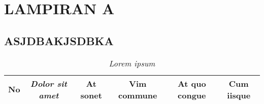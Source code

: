 \renewcommand{\thesection}{}
\renewcommand{\thesubsection}{\arabic{section}.\arabic{subsection}}
\makeatletter
\def\@seccntformat#1{\csname #1ignore\expandafter\endcsname\csname the#1\endcsname\quad}
\let\sectionignore\@gobbletwo
\let\latex@numberline\numberline
\def\numberline#1{\if\relax#1\relax\else\latex@numberline{#1}\fi}
\makeatother

\chapter{LAMPIRAN A}
\section{ASJDBAKJSDBKA}

\begin{small}
\begin{longtable}[c]{|r|l|r|r|r|l|}
\caption{\textit{Lorem ipsum}} 
\label{lampiran-dataset}\\
\hline
\multicolumn{1}{|c|}{\textbf{No}} &
  \multicolumn{1}{c|}{\textit{\textbf{Dolor sit amet}}} &
  \multicolumn{1}{c|}{\textbf{At sonet}} &
  \multicolumn{1}{c|}{\textbf{Vim commune}} &
  \multicolumn{1}{c|}{\textbf{At quo congue}} &
  \multicolumn{1}{c|}{\textbf{Cum iisque}} \\ \hline
\endhead


\end{longtable}
\end{small}
